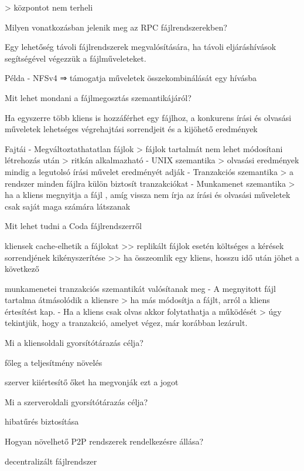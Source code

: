 \documentclass[12pt]{article}
\begin{document}
\begin{description}[style=unboxed]
        > központot nem terheli
    \item  Milyen vonatkozásban jelenik meg az RPC fájlrendszerekben?
    \item Egy lehetőség távoli fájlrendszerek megvalósítására, ha távoli eljáráshívások segítségével végezzük a fájlműveleteket.
    \item Példa
        - NFSv4 ⇒ támogatja műveletek összekombinálását egy hívásba
    \item  Mit lehet mondani a fájlmegosztás szemantikájáról?  
    \item Ha egyszerre több kliens is hozzáférhet egy fájlhoz, a konkurens írási és olvasási műveletek lehetséges végrehajtási sorrendjeit és a kijöhető eredmények
    \item Fajtái
        - Megváltoztathatatlan fájlok
        > fájlok tartalmát nem lehet módosítani létrehozás után
        > ritkán alkalmazható
        - UNIX szemantika
        > olvasási eredmények mindig a legutolsó írási művelet eredményét adják
        - Tranzakciós szemantika
        > a rendszer minden fájlra külön biztosít tranzakciókat
        - Munkamenet szemantika
        > ha a kliens megnyitja a fájl , amíg vissza nem írja az írási és olvasási műveletek csak saját maga számára látszanak
    \item  Mit lehet tudni a Coda fájlrendszerről 
    \item kliensek cache-elhetik a fájlokat
        >> replikált fájlok esetén költséges a kérések sorrendjének kikényszerítése
        >> ha összeomlik egy kliens, hosszu idő után jöhet a következő
    \item munkamenetei tranzakciós szemantikát valósítanak meg
        - A megnyitott fájl tartalma átmásolódik a kliensre
        > ha más módosítja a fájlt, arról a kliens értesítést kap.
        - Ha a kliens csak olvas akkor folytathatja a működését 
        > úgy tekintjük, hogy a tranzakció, amelyet végez, már korábban lezárult.	
    \item  Mi a kliensoldali gyorsítótárazás célja?
    \item főleg a teljesítmény növelés
    \item szerver kiiértesítő őket ha megvonják ezt a jogot
    \item  Mi a szerveroldali gyorsítótárazás célja?
    \item hibatűrés biztosítása
    \item  Hogyan növelhető P2P rendszerek rendelkezésre állása?
    \item decentralizált fájlrendszer

\end{description}
\end{document}
